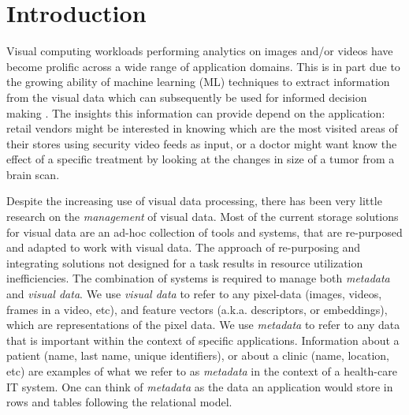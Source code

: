 \section{Introduction}
\label{intro}

Visual computing workloads performing analytics on images and/or videos
have become prolific across a wide range of application domains.
This is in part due to the growing ability of machine learning (ML) techniques
to extract information from the visual data which can subsequently be used
for informed decision making \cite{vdms-nips}.
The insights this information can provide depend on the
application: retail vendors might be interested in knowing which are the most
visited areas of their stores using security video feeds as input,
or a doctor might want know the effect of a specific treatment by
looking at the changes in size of a tumor from a brain scan.

Despite the increasing use of visual data processing,
there has been very little research on the \textit{management} of visual data.
Most of the current storage solutions for visual data are an ad-hoc collection
of tools and systems, that are re-purposed and adapted to work with visual data.
The approach of re-purposing and integrating solutions not designed for a task
results in resource utilization inefficiencies\cite{rasdaman}.
The combination of systems is required to manage both \textit{metadata} and
\textit{visual data}.
We use \textit{visual data} to refer to any pixel-data (images, videos,
frames in a video, etc), and feature vectors (a.k.a. descriptors, or embeddings),
which are representations of the pixel data.
We use \textit{metadata} to refer to any data that is important within
the context of specific applications.
Information about a patient (name, last name, unique identifiers), or
about a clinic (name, location, etc) are examples of what we refer to
as \textit{metadata} in the context of a health-care IT system.
One can think of \textit{metadata} as the data an application would store
in rows and tables following the relational model.


